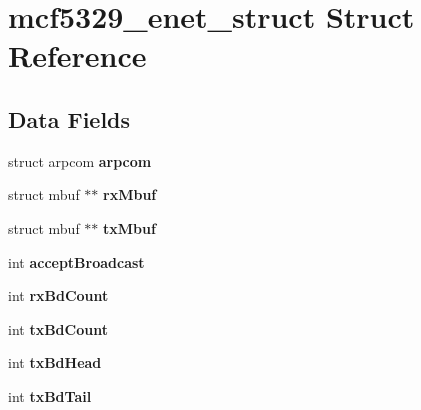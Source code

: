 \hypertarget{structmcf5329__enet__struct}{}\section{mcf5329\+\_\+enet\+\_\+struct Struct Reference}
\label{structmcf5329__enet__struct}
\subsection*{Data Fields}
\begin{DoxyCompactItemize}
\item 
\mbox{\label{structmcf5329__enet__struct_aef2146abc649053624d5b377da937b1e}} 
struct arpcom {\bfseries arpcom}
\item 
\mbox{\label{structmcf5329__enet__struct_a3c20d0617d5ac4ad45a5a726cb55e46b}} 
struct mbuf $\ast$$\ast$ {\bfseries rx\+Mbuf}
\item 
\mbox{\label{structmcf5329__enet__struct_a7abc6e0a0742128c64a51b804b0248bc}} 
struct mbuf $\ast$$\ast$ {\bfseries tx\+Mbuf}
\item 
\mbox{\label{structmcf5329__enet__struct_a0956ae231c25a5b1b0512da90240cf6d}} 
int {\bfseries accept\+Broadcast}
\item 
\mbox{\label{structmcf5329__enet__struct_ad64d6b0ba5144e39555ca8924a9ca3d8}} 
int {\bfseries rx\+Bd\+Count}
\item 
\mbox{\label{structmcf5329__enet__struct_a3af243adb41b8f77d8ae0c03d0cb803f}} 
int {\bfseries tx\+Bd\+Count}
\item 
\mbox{\label{structmcf5329__enet__struct_aa5d64581e074145d7c36ba9798d580ef}} 
int {\bfseries tx\+Bd\+Head}
\item 
\mbox{\label{structmcf5329__enet__struct_a07b3f2a8345a7f47257df56234e9f26d}} 
int {\bfseries tx\+Bd\+Tail}
\item 
\mbox{\label{structmcf5329__enet__struct_a442a5c935f509b22dc0683ca8d0a525d}} 

\end{DoxyCompactItemize}
